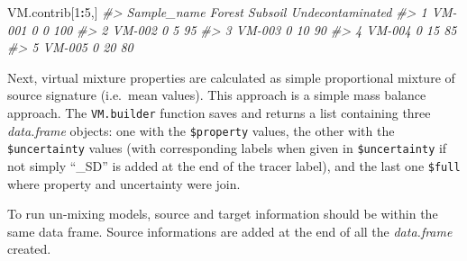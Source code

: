 \documentclass[
]{article}
\newenvironment{Shaded}{\begin{snugshade}}{\end{snugshade}}
\newcommand{\CommentTok}[1]{\textcolor[rgb]{0.56,0.35,0.01}{\textit{#1}}}
\newcommand{\DecValTok}[1]{\textcolor[rgb]{0.00,0.00,0.81}{#1}}
\newcommand{\NormalTok}[1]{#1}
\newcommand{\SpecialCharTok}[1]{\textcolor[rgb]{0.81,0.36,0.00}{\textbf{#1}}}
\begin{document}
\begin{Shaded}
\begin{Highlighting}[]
\NormalTok{VM.contrib[}\DecValTok{1}\SpecialCharTok{:}\DecValTok{5}\NormalTok{,]}
\CommentTok{\#\textgreater{}   Sample\_name Forest Subsoil Undecontaminated}
\CommentTok{\#\textgreater{} 1      VM{-}001      0       0              100}
\CommentTok{\#\textgreater{} 2      VM{-}002      0       5               95}
\CommentTok{\#\textgreater{} 3      VM{-}003      0      10               90}
\CommentTok{\#\textgreater{} 4      VM{-}004      0      15               85}
\CommentTok{\#\textgreater{} 5      VM{-}005      0      20               80}
\end{Highlighting}
\end{Shaded}

Next, virtual mixture properties are calculated as simple proportional
mixture of source signature (i.e.~mean values). This approach is a
simple mass balance approach. The \texttt{VM.builder} function saves and
returns a list containing three \emph{data.frame} objects: one with the
\texttt{\$property} values, the other with the \texttt{\$uncertainty}
values (with corresponding labels when given in \texttt{\$uncertainty}
if not simply ``\_SD'' is added at the end of the tracer label), and the
last one \texttt{\$full} where property and uncertainty were join.

To run un-mixing models, source and target information should be within
the same data frame. Source informations are added at the end of all the
\emph{data.frame} created.
\end{document}
